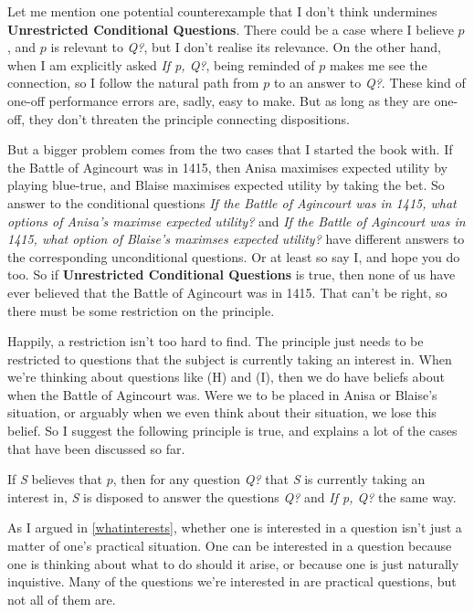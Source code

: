 \documentclass[11pt,]{book}
\providecommand{\tightlist}{%
  \setlength{\itemsep}{0pt}\setlength{\parskip}{0pt}}
\begin{document}
Let me mention one potential counterexample that I don't think undermines \textbf{Unrestricted Conditional Questions}. There could be a case where I believe \(p\), and \(p\) is relevant to \emph{Q?}, but I don't realise its relevance. On the other hand, when I am explicitly asked \emph{If p, Q?}, being reminded of \(p\) makes me see the connection, so I follow the natural path from \(p\) to an answer to \emph{Q?}. These kind of one-off performance errors are, sadly, easy to make. But as long as they are one-off, they don't threaten the principle connecting dispositions.

But a bigger problem comes from the two cases that I started the book with. If the Battle of Agincourt was in 1415, then Anisa maximises expected utility by playing blue-true, and Blaise maximises expected utility by taking the bet. So answer to the conditional questions \emph{If the Battle of Agincourt was in 1415, what options of Anisa's maximse expected utility?} and \emph{If the Battle of Agincourt was in 1415, what option of Blaise's maximses expected utility?} have different answers to the corresponding unconditional questions. Or at least so say I, and hope you do too. So if \textbf{Unrestricted Conditional Questions} is true, then none of us have ever believed that the Battle of Agincourt was in 1415. That can't be right, so there must be some restriction on the principle.

Happily, a restriction isn't too hard to find. The principle just needs to be restricted to questions that the subject is currently taking an interest in. When we're thinking about questions like (H) and (I), then we do have beliefs about when the Battle of Agincourt was. Were we to be placed in Anisa or Blaise's situation, or arguably when we even think about their situation, we lose this belief. So I suggest the following principle is true, and explains a lot of the cases that have been discussed so far.

\begin{description}
\tightlist
\item[Relevant Conditional Questions]
If \emph{S} believes that \(p\), then for any question \emph{Q?} that \emph{S} is currently taking an interest in, \emph{S} is disposed to answer the questions \emph{Q?} and \emph{If p, Q?} the same way.
\end{description}

As I argued in \ref{whatinterests}, whether one is interested in a question isn't just a matter of one's practical situation. One can be interested in a question because one is thinking about what to do should it arise, or because one is just naturally inquistive. Many of the questions we're interested in are practical questions, but not all of them are.
\end{document}
